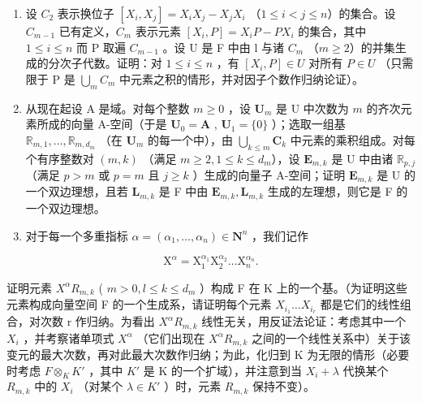 \begin{enumerate}
\def\labelenumi{(\alph{enumi})}
\item
  设 \(C_{2}\) 表示换位子 \([X_{i}, X_{j}] = X_{i}X_{j} - X_{j}X_{i}\) （\(1 \leqslant i < j \leqslant n\)）的集合。设 \(C_{m-1}\) 已有定义，\(C_{m}\) 表示元素 \([X_{i}, P] = X_{i}P - PX_{i}\) 的集合，其中 \(1 \leqslant i \leqslant n\) 而 P 取遍 \(C_{m-1}\) 。设 U 是 F 中由 l 与诸 \(C_{m}\) （\(m \geqslant 2\)）的并集生成的分次子代数。证明：对 \(1 \leqslant i \leqslant n\) ，有 \([X_{i}, P] \in U\) 对所有 \(P \in U\) （只需限于 P 是 \(\bigcup_{m} C_{m}\) 中元素之积的情形，并对因子个数作归纳论证）。
\item
  从现在起设 A 是域。对每个整数 \(m \geqslant 0\) ，设 \(\mathbf{U}_m\) 是 U 中次数为 \(m\) 的齐次元素所成的向量 A-空间（于是 \(\mathbf{U}_0 = \mathbf{A}\) , \(\mathbf{U}_1 = \{0\}\) ）；选取一组基 \(\mathbb{R}_{m,1}, \ldots, \mathbb{R}_{m,d_m}\) （在 \(\mathbf{U}_m\) 的每一个中），由 \(\bigcup_{k\leqslant m}\mathbf{C}_k\) 中元素的乘积组成。对每个有序整数对 \((m,k)\) （满足 \(m\geqslant 2,1\leqslant k\leqslant d_m\)），设 \(\mathbf{E}_{m,k}\) 是 U 中由诸 \(\mathbb{R}_{p,j}\) （满足 \(p > m\) 或 \(p = m\) 且 \(j\geqslant k\) ）生成的向量子 A-空间；证明 \(\mathbf{E}_{m,k}\) 是 U 的一个双边理想，且若 \(\mathbf{L}_{m,k}\) 是 F 中由 \(\mathbf{E}_{m,k},\mathbf{L}_{m,k}\) 生成的左理想，则它是 F 的一个双边理想。
\item
  对于每一个多重指标 \(\alpha = (\alpha_{1},\ldots ,\alpha_{n})\in \mathbf{N}^{n}\) ，我们记作
\end{enumerate}

\[
\mathrm{X} ^ {\alpha} = \mathrm{X} _ {1} ^ {\alpha_ {1}} \mathrm{X} _ {2} ^ {\alpha_ {2}} \dots \mathrm{X} _ {n} ^ {\alpha_ {n}}.
\]

证明元素 \(X^{\alpha}R_{m,k}\) ( \(m > 0, l \leqslant k \leqslant d_{m}\) ）构成 F 在 K 上的一个基。（为证明这些元素构成向量空间 F 的一个生成系，请证明每个元素 \(X_{i_{1}} \ldots X_{i_{r}}\) 都是它们的线性组合，对次数 r 作归纳。为看出 \(X^{\alpha}R_{m,k}\) 线性无关，用反证法论证：考虑其中一个 \(X_{i}\) ，并考察诸单项式 \(X^{\alpha}\) （它们出现在 \(X^{\alpha}R_{m,k}\) 之间的一个线性关系中）关于该变元的最大次数，再对此最大次数作归纳；为此，化归到 K 为无限的情形（必要时考虑 \(F \otimes_{K} K'\) ，其中 \(K'\) 是 K 的一个扩域），并注意到当 \(X_{i} + \lambda\) 代换某个 \(R_{m,k}\) 中的 \(X_{i}\) （对某个 \(\lambda \in K'\) ）时，元素 \(R_{m,k}\) 保持不变）。

